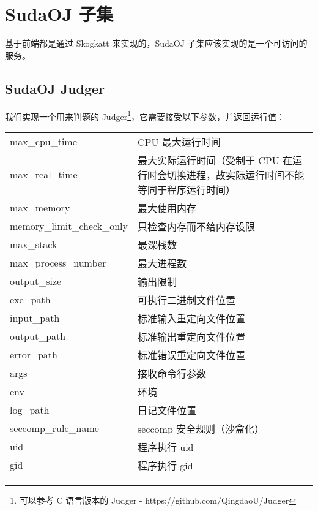 
\section{SudaOJ 子集}
基于前端都是通过 Skogkatt 来实现的，SudaOJ 子集应该实现的是一个可访问的服务。

\subsection{SudaOJ Judger}
我们实现一个用来判题的 Judger\footnote{可以参考 C 语言版本的 Judger - %
https://github.com/QingdaoU/Judger}，它需要接受以下参数，并返回运行值：

\begin{center}
\begin{tabular}{lp{6cm}}
    \hline
    max\_cpu\_time      & CPU 最大运行时间  \\
    max\_real\_time     & 最大实际运行时间（受制于 CPU 在运行时会切换进程，故实际运行时间不能等同于程序运行时间）  \\
    max\_memory         & 最大使用内存      \\
    memory\_limit\_check\_only & 只检查内存而不给内存设限 \\
    max\_stack          & 最深栈数 \\
    max\_process\_number &  最大进程数 \\
    output\_size        & 输出限制 \\
    \hline
    exe\_path           & 可执行二进制文件位置 \\
    input\_path         & 标准输入重定向文件位置          \\
    output\_path        & 标准输出重定向文件位置          \\
    error\_path         & 标准错误重定向文件位置            \\
    \hline
    args                & 接收命令行参数            \\
    env                 & 环境                      \\
    \hline
    log\_path           & 日记文件位置          \\
    seccomp\_rule\_name & seccomp 安全规则（沙盒化） \\
    \hline
    uid                 & 程序执行 uid          \\
    gid                 & 程序执行 gid          \\
    \hline
\end{tabular}
\end{center}

